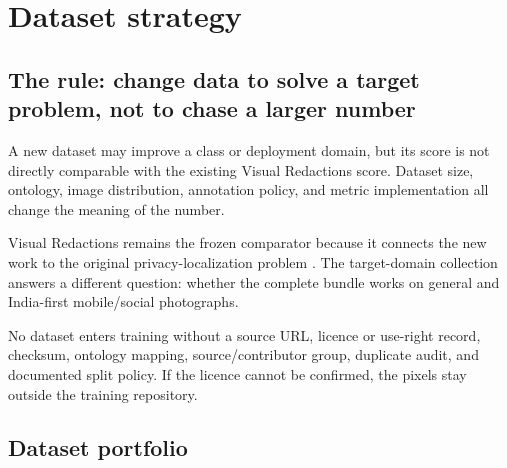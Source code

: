 \chapter{Dataset strategy}

\section{The rule: change data to solve a target problem, not to chase a larger number}

A new dataset may improve a class or deployment domain, but its score is not directly comparable with the existing Visual Redactions score. Dataset size, ontology, image distribution, annotation policy, and metric implementation all change the meaning of the number.

Visual Redactions remains the frozen comparator because it connects the new work to the original privacy-localization problem \citep{orekondy2018visual}. The target-domain collection answers a different question: whether the complete bundle works on general and India-first mobile/social photographs.

\begin{truthbox}
No dataset enters training without a source URL, licence or use-right record, checksum, ontology mapping, source/contributor group, duplicate audit, and documented split policy. If the licence cannot be confirmed, the pixels stay outside the training repository.
\end{truthbox}

\section{Dataset portfolio}

